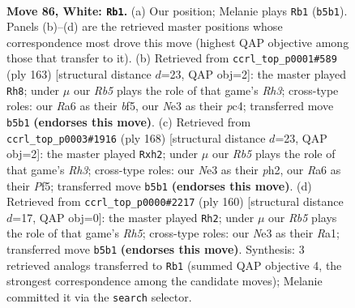 \documentclass[11pt]{article}
\begin{document}
\clearpage

\begin{figure}[p]\centering
\begin{subfigure}{0.46\textwidth}\centering
\resizebox{\linewidth}{!}{%
\newchessgame
\chessboard[
  setfen={7k/5rb1/R1P5/1R6/7K/4N3/8/8 w - - 11 86},
  showmover=false,
  pgfstyle=straightmove, color=movearrow, markmove={b5-b1}
]}
\caption{}
\end{subfigure}\hfill
\begin{subfigure}{0.46\textwidth}\centering
\resizebox{\linewidth}{!}{%
\newchessgame
\chessboard[
  setfen={8/2k5/7r/p3KB2/2PB4/1P6/8/8 b - - 2 82},
  showmover=false,
  pgfstyle=straightmove, color=movearrow, markmove={h6-h8}
]}
\caption{}
\end{subfigure}
\\[4pt]
\begin{subfigure}{0.46\textwidth}\centering
\resizebox{\linewidth}{!}{%
\newchessgame
\chessboard[
  setfen={8/6k1/5b2/2p2P2/5K2/7R/7p/8 w - - 2 85},
  showmover=false,
  pgfstyle=straightmove, color=movearrow, markmove={h3-h2}
]}
\caption{}
\end{subfigure}\hfill
\begin{subfigure}{0.46\textwidth}\centering
\resizebox{\linewidth}{!}{%
\newchessgame
\chessboard[
  setfen={8/4k3/2r1b3/7R/8/3K4/8/R7 w - - 19 81},
  showmover=false,
  pgfstyle=straightmove, color=movearrow, markmove={h5-h2}
]}
\caption{}
\end{subfigure}
\caption{\textbf{Move 86, White: \texttt{Rb1}.} (a) Our position; Melanie plays \texttt{Rb1} (\texttt{b5b1}). Panels (b)--(d) are the retrieved master positions whose correspondence most drove this move (highest QAP objective among those that transfer to it). (b) Retrieved from \texttt{ccrl\_top\_p0001\#589} (ply 163) [structural distance $d$=23, QAP obj=2]: the master played \texttt{Rh8}; under $\mu$ our \emph{Rb5} plays the role of that game's \emph{Rh3}; cross-type roles: our \emph{R}a6 as their \emph{b}f5, our \emph{N}e3 as their \emph{p}c4; transferred move \texttt{b5b1} \textbf{(endorses this move)}. (c) Retrieved from \texttt{ccrl\_top\_p0003\#1916} (ply 168) [structural distance $d$=23, QAP obj=2]: the master played \texttt{Rxh2}; under $\mu$ our \emph{Rb5} plays the role of that game's \emph{Rh3}; cross-type roles: our \emph{N}e3 as their \emph{p}h2, our \emph{R}a6 as their \emph{P}f5; transferred move \texttt{b5b1} \textbf{(endorses this move)}. (d) Retrieved from \texttt{ccrl\_top\_p0000\#2217} (ply 160) [structural distance $d$=17, QAP obj=0]: the master played \texttt{Rh2}; under $\mu$ our \emph{Rb5} plays the role of that game's \emph{Rh5}; cross-type roles: our \emph{N}e3 as their \emph{R}a1; transferred move \texttt{b5b1} \textbf{(endorses this move)}. Synthesis: 3 retrieved analogs transferred to \texttt{Rb1} (summed QAP objective 4, the strongest correspondence among the candidate moves); Melanie committed it via the \texttt{search} selector.}
\label{fig:thought-m170}
\end{figure}
\end{document}
